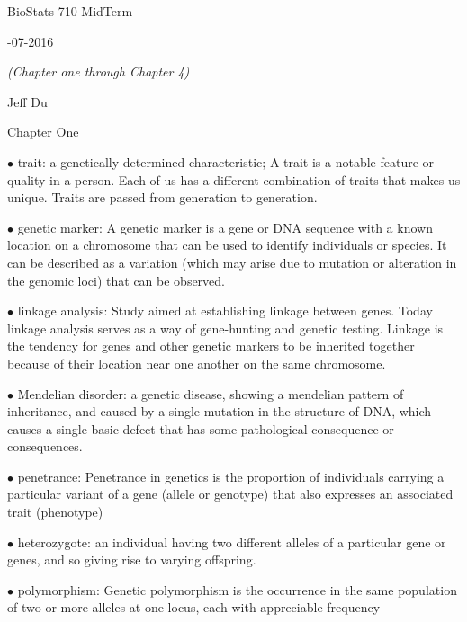 \documentclass{article}
\begin{document}
\centerline{\sc \large BioStats 710 MidTerm}
\vspace{1pc}
\centerline{-07-2016}
\vspace{1pc}

\centerline{\it (Chapter one through Chapter 4)}

\vspace{1pc}
\centerline{\sc    Jeff Du}
\vspace{2pc}


\centerline{\sc Chapter One}
\vspace{0.2in}

$\bullet$ trait: 
a genetically determined characteristic; A trait is a notable feature or quality in a person. Each of us has a different combination of traits that makes us unique. 
Traits are passed from generation to generation.\vspace{0.1in}


$\bullet$ genetic marker: 
A genetic marker is a gene or DNA sequence with a known location on a chromosome that can be used to identify individuals or species. It can be described as a variation (which may arise due to mutation or alteration in the genomic loci) that can be observed. \vspace{0.1in}


$\bullet$ linkage analysis: 
Study aimed at establishing linkage between genes. Today linkage analysis serves as a way of gene-hunting and genetic testing. Linkage is the tendency for genes and other genetic markers to be inherited together because of their location near one another on the same chromosome.


\vspace{0.1in}
$\bullet$ Mendelian disorder: 
a genetic disease, showing a mendelian pattern of inheritance, and caused by a single mutation in the structure of DNA, which causes a single basic defect that has some pathological consequence or consequences.


\vspace{0.1in}
$\bullet$ penetrance: 
Penetrance in genetics is the proportion of individuals carrying a particular variant of a gene (allele or genotype) that also expresses an associated trait (phenotype)


\vspace{0.1in}
$\bullet$ heterozygote: 
an individual having two different alleles of a particular gene or genes, and so giving rise to varying offspring.


\vspace{0.1in}
$\bullet$ polymorphism: 
Genetic polymorphism is the occurrence in the same population of two or more alleles at one locus, each with appreciable frequency
\end{document}
